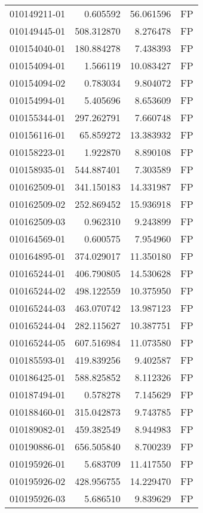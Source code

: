 \begin{tabular}{lrrl}
010149211-01 &    0.605592 &    56.061596 &   FP \\
010149445-01 &  508.312870 &     8.276478 &   FP \\
010154040-01 &  180.884278 &     7.438393 &   FP \\
010154094-01 &    1.566119 &    10.083427 &   FP \\
010154094-02 &    0.783034 &     9.804072 &   FP \\
010154994-01 &    5.405696 &     8.653609 &   FP \\
010155344-01 &  297.262791 &     7.660748 &   FP \\
010156116-01 &   65.859272 &    13.383932 &   FP \\
010158223-01 &    1.922870 &     8.890108 &   FP \\
010158935-01 &  544.887401 &     7.303589 &   FP \\
010162509-01 &  341.150183 &    14.331987 &   FP \\
010162509-02 &  252.869452 &    15.936918 &   FP \\
010162509-03 &    0.962310 &     9.243899 &   FP \\
010164569-01 &    0.600575 &     7.954960 &   FP \\
010164895-01 &  374.029017 &    11.350180 &   FP \\
010165244-01 &  406.790805 &    14.530628 &   FP \\
010165244-02 &  498.122559 &    10.375950 &   FP \\
010165244-03 &  463.070742 &    13.987123 &   FP \\
010165244-04 &  282.115627 &    10.387751 &   FP \\
010165244-05 &  607.516984 &    11.073580 &   FP \\
010185593-01 &  419.839256 &     9.402587 &   FP \\
010186425-01 &  588.825852 &     8.112326 &   FP \\
010187494-01 &    0.578278 &     7.145629 &   FP \\
010188460-01 &  315.042873 &     9.743785 &   FP \\
010189082-01 &  459.382549 &     8.944983 &   FP \\
010190886-01 &  656.505840 &     8.700239 &   FP \\
010195926-01 &    5.683709 &    11.417550 &   FP \\
010195926-02 &  428.956755 &    14.229470 &   FP \\
010195926-03 &    5.686510 &     9.839629 &   FP \\

\end{tabular}
